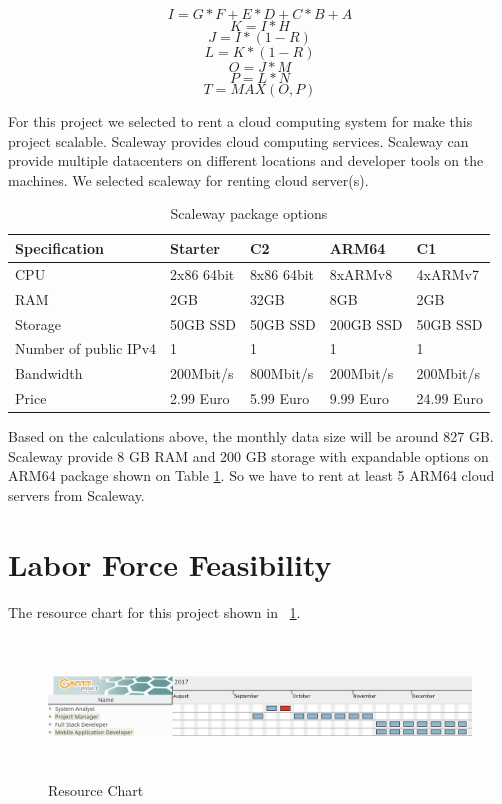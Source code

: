 \[ I = G * F + E * D + C * B + A \]
\[ K = I * H \]
\[ J = I * (1 - R) \]
\[ L = K * (1 - R) \]
\[ O = J * M \]
\[ P = L * N \]
\[ T = MAX (O, P) \]

For this project we selected to rent a cloud computing system for make this project scalable. Scaleway \cite{scaleway} provides cloud computing services. Scaleway can provide multiple datacenters on different locations and developer tools on the machines. We selected scaleway for renting cloud server(s).

\begin{table}[!ht]
\centering
\caption{Scaleway package options}
\label{scaleway}
\begin{tabular}{|l|l|l|l|l|}
\hline
\textbf{Specification}& \textbf{Starter} & \textbf{C2}  & \textbf{ARM64} & \textbf{C1} \\ \hline
CPU                             & 2x86 64bit & 8x86 64bit  & 8xARMv8 & 4xARMv7 \\ \hline
RAM                             & 2GB & 32GB & 8GB & 2GB \\ \hline
Storage                         & 50GB SSD & 50GB SSD & 200GB SSD & 50GB SSD \\ \hline
Number of public IPv4  & 1 & 1 & 1 & 1  \\ \hline
Bandwidth                       & 200Mbit/s & 800Mbit/s & 200Mbit/s & 200Mbit/s \\ \hline
Price                       & 2.99 Euro & 5.99 Euro & 9.99 Euro & 24.99 Euro \\ \hline
\end{tabular}
\end{table}

Based on the calculations above, the monthly data size will be around 827 GB. Scaleway provide 8 GB RAM and 200 GB storage with expandable options on ARM64 package shown on Table \ref{scaleway}. So we have to rent at least 5 ARM64 cloud servers from Scaleway.

\section{Labor Force Feasibility}
The resource chart for this project shown in ~\ref{fig:resource}.

\begin{figure}[!htbp]
\centering
\includegraphics[width=\textwidth, height=10em]{projectChapters/images/resource.png}
\caption{Resource Chart}
\label{fig:resource}
\end{figure}


